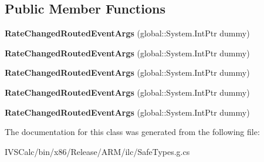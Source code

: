 \subsection*{Public Member Functions}
\begin{DoxyCompactItemize}
\item 
\mbox{\label{class_windows_1_1_u_i_1_1_xaml_1_1_media_1_1_rate_changed_routed_event_args_a08472dc77cae3eb3d45bee9c11f7ec4e}} 
{\bfseries Rate\+Changed\+Routed\+Event\+Args} (global\+::\+System.\+Int\+Ptr dummy)
\item 
\mbox{\label{class_windows_1_1_u_i_1_1_xaml_1_1_media_1_1_rate_changed_routed_event_args_a08472dc77cae3eb3d45bee9c11f7ec4e}} 
{\bfseries Rate\+Changed\+Routed\+Event\+Args} (global\+::\+System.\+Int\+Ptr dummy)
\item 
\mbox{\label{class_windows_1_1_u_i_1_1_xaml_1_1_media_1_1_rate_changed_routed_event_args_a08472dc77cae3eb3d45bee9c11f7ec4e}} 
{\bfseries Rate\+Changed\+Routed\+Event\+Args} (global\+::\+System.\+Int\+Ptr dummy)
\item 
\mbox{\label{class_windows_1_1_u_i_1_1_xaml_1_1_media_1_1_rate_changed_routed_event_args_a08472dc77cae3eb3d45bee9c11f7ec4e}} 
{\bfseries Rate\+Changed\+Routed\+Event\+Args} (global\+::\+System.\+Int\+Ptr dummy)
\item 
\mbox{\label{class_windows_1_1_u_i_1_1_xaml_1_1_media_1_1_rate_changed_routed_event_args_a08472dc77cae3eb3d45bee9c11f7ec4e}} 
{\bfseries Rate\+Changed\+Routed\+Event\+Args} (global\+::\+System.\+Int\+Ptr dummy)
\end{DoxyCompactItemize}


The documentation for this class was generated from the following file\+:\begin{DoxyCompactItemize}
\item 
I\+V\+S\+Calc/bin/x86/\+Release/\+A\+R\+M/ilc/Safe\+Types.\+g.\+cs\end{DoxyCompactItemize}
